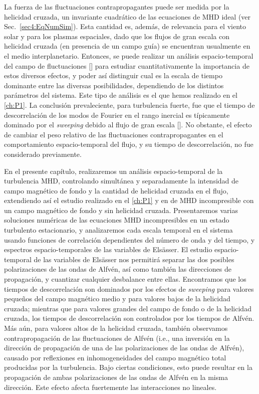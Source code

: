 La fuerza de las fluctuaciones contrapropagantes puede ser medida por
la helicidad cruzada, un invariante cuadrático de las ecuaciones de
MHD ideal (ver Sec.~\ref{sec4:EqNumSim}).  Esta cantidad es, además, de
relevancia para el viento solar y para los plasmas espaciales, dado
que los flujos de gran escala con helicidad cruzada (en presencia de
un campo guía) se encuentran usualmente en el medio
interplanetario. Entonces, se puede realizar un análisis
espacio-temporal del campo de fluctuaciones [\cite{servidio_time_2011,
clark_di_leoni_spatio-temporal_2015}] para estudiar cuantitativamente
la importancia de estos diversos efectos, y poder así distinguir cual
es la escala de tiempo dominante entre las diversas posibilidades,
dependiendo de los distintos parámetros del sistema. Este tipo de
análisis es el que hemos realizado en el \cref{ch:P1}. La
conclusión prevaleciente, para turbulencia fuerte, fue que el tiempo
de descorrelación de los modos de Fourier en el rango inercial es
típicamente dominado por el \textit{sweeping} debido al flujo de gran
escala [\cite{servidio_time_2011, chen_sweeping_1989,
lugones_2016_spatiotemporal}]. No obstante, el efecto de cambiar el
peso relativo de las fluctuaciones contrapropagantes en el
comportamiento espacio-temporal del flujo, y su tiempo de
descorrelación, no fue considerado previamente.

En el presente capítulo, realizaremos un análisis espacio-temporal de la
turbulencia MHD, controlando simultánea y separadamente la intensidad
de campo magnético de fondo y la cantidad de helicidad cruzada en el
flujo, extendiendo así el estudio realizado en el \cref{ch:P1} y en 
\cite{lugones_2016_spatiotemporal} de MHD incompresible con un campo
magnético de fondo y sin helicidad cruzada. Presentaremos varias
soluciones numéricas de las ecuaciones MHD incompresibles en un estado
turbulento estacionario, y analizaremos cada escala temporal en el
sistema usando funciones de correlación dependientes del número de
onda y del tiempo, y espectros espacio-temporales de las variables de
Els\"asser. El estudio espacio-temporal de las variables de
Els\"asser nos permitirá separar las dos posibles polarizaciones de las
ondas de Alfvén, así como también las direcciones de propagación, y
cuantizar cualquier desbalance entre ellas.
Encontramos que los tiempos de descorrelación son dominados por los
efectos de \textit{sweeping} para valores pequeños del campo magnético medio y
para valores bajos de la helicidad cruzada; mientras que para valores
grandes del campo de fondo o de la helicidad cruzada, los tiempos de
descorrelación son controlados por los tiempos de Alfvén.  Más aún,
para valores altos de la helicidad cruzada, también observamos
contrapropagación de las fluctuaciones de Alfvén (i.e., una inversión
en la dirección de propagación de una de las polarizaciones de las
ondas de Alfvén), causado por reflexiones en inhomogeneidades del
campo magnético total producidas por la turbulencia. Bajo ciertas
condiciones, esto puede resultar en la propagación de ambas
polarizaciones de las ondas de Alfvén en la misma dirección. Este
efecto afecta fuertemente las interacciones no lineales.

